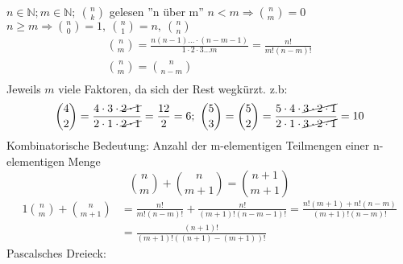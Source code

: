 $n \in \mathbb{N}; m \in \mathbb{N};\ \binom{n}{k}$  gelesen ''n über m'' $n < m \Rightarrow \binom{n}{m} = 0$ $n \geq m \Rightarrow \binom{n}{0} = 1,\ \binom{n}{1} = n,\ \binom{n}{n}$
\begin{gather*}
    \binom{n}{m} = \frac{n(n-1) \dots \cdot (n-m-1)}{1\cdot 2\cdot3 \dots m} = \frac{n!}{m!(n-m)!}\\
    \binom{n}{m}=\binom{n}{n-m}\\
\end{gather*} Jeweils $m$ viele Faktoren, da sich der Rest wegkürzt.
z.b:
\[\binom{4}{2} = \frac{4 \cdot 3 \cdot \cancel{2 \cdot 1}}{2 \cdot 1 \cdot \cancel{2 \cdot 1}} = \frac{12}{2} = 6;\ \binom{5}{3} = \binom{5}{2} = \frac{5 \cdot 4 \cdot  \cancel{3 \cdot 2 \cdot 1}}{2 \cdot 1 \cdot \cancel{3 \cdot 2 \cdot 1}} = 10\]
Kombinatorische Bedeutung: Anzahl der m-elementigen Teilmengen einer n-elementigen Menge
\[\binom{n}{m}+\binom{n}{m+1}=\binom{n+1}{m+1}\]
\begin{alignat*}{1}
    \binom{n}{m}+\binom{n}{m+1} & =\frac{n!}{m!(n-m)!}+\frac{n!}{(m+1)!(n-m-1)!}=\frac{n!(m+1)+n!(n-m)}{(m+1)!(n-m)!} \\
    & =\frac{(n+1)!}{(m+1)!((n+1)-(m+1))!}
\end{alignat*}
Pascalsches Dreieck: \\
